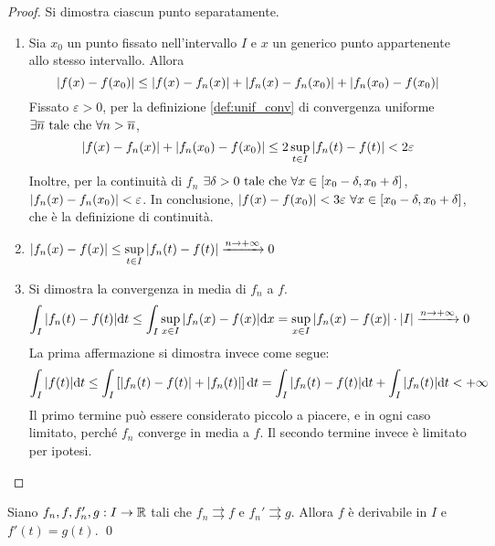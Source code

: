 \begin{proof}
    Si dimostra ciascun punto separatamente.
    \begin{enumerate}
        \item Sia $x_0$ un punto fissato nell'intervallo $I$ e $x$ un generico punto appartenente allo stesso intervallo. Allora
        $$
            \abs{f(x)-f(x_0)}\leq\abs{f(x)-f_n(x)}+\abs{f_n(x)-f_n(x_0)}+\abs{f_n(x_0)-f(x_0)}
        $$
        Fissato $\varepsilon > 0$, per la definizione \ref{def:unif_conv} di convergenza uniforme $\exists \overline{n} \text{ tale che } \forall n > \overline{n}$,
        $$\abs{f(x)-f_n(x)}+\abs{f_n(x_0)-f(x_0)}\leq 2 \sup_{t \in I}\abs{f_n(t)-f(t)}<2\varepsilon$$
        Inoltre, per la continuità di $f_n$ $\exists \delta>0 \text{ tale che } \forall x \in [x_0-\delta,x_0+\delta]$, $\abs{f_n(x)-f_n(x_0)}<\varepsilon$.
        In conclusione, $\abs{f(x)-f(x_0)} < 3\varepsilon \ \forall x \in [x_0-\delta,x_0+\delta]$, che è la definizione di continuità.
        \item $\abs{f_n(x)-f(x)}\leq \sup\limits_{t\in I}\abs{f_n(t)-f(t)}\xrightarrow{n\to+\infty}0$
        \item Si dimostra la convergenza in media di $f_n$ a $f$.
        $$
            \int_I\abs{f_n(t)-f(t)}\dd t \leq \int_I\sup_{x\in I}\abs{f_n(x)-f(x)}\dd x=\sup_{x \in I}\abs{f_n(x)-f(x)}\cdot\abs{I}\xrightarrow{n\to +\infty}0
        $$
        La prima affermazione si dimostra invece come segue:
        $$
            \int_I\abs{f(t)}\dd t\leq \int_I\left[\abs{f_n(t)-f(t)}+\abs{f_n(t)}\right]\dd t=\int_I\abs{f_n(t)-f(t)}\dd t+\int_I\abs{f_n(t)}\dd t<+\infty
        $$
        Il primo termine può essere considerato piccolo a piacere, e in ogni caso limitato, perché $f_n$ converge in media a $f$. Il secondo termine invece è limitato per ipotesi.
    \end{enumerate}
\end{proof}

\begin{theorem}
    Siano $f_n, f, f_n', g: I \to \mathbb{R}$ tali che $f_n \rightrightarrows f$ e $f_n' \rightrightarrows g$. Allora $f$ è derivabile in $I$ e $f'(t) = g(t)$. \qed
\end{theorem}